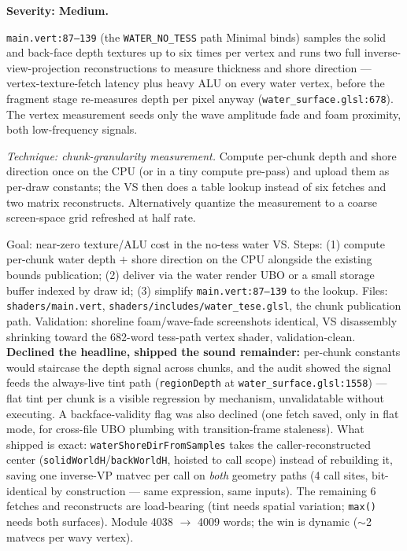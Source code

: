 \documentclass[11pt,a4paper]{article}
\begin{document}
\textbf{Severity: Medium.}

\texttt{main.vert:87--139} (the \texttt{WATER\_NO\_TESS} path Minimal binds)
samples the solid and back-face depth textures up to six times per vertex and
runs two full inverse-view-projection reconstructions to measure thickness and
shore direction --- vertex-texture-fetch latency plus heavy ALU on every water
vertex, before the fragment stage re-measures depth per pixel anyway
(\texttt{water\_surface.glsl:678}). The vertex measurement seeds only the wave
amplitude fade and foam proximity, both low-frequency signals.

\textit{Technique: chunk-granularity measurement.} Compute per-chunk depth and
shore direction once on the CPU (or in a tiny compute pre-pass) and upload
them as per-draw constants; the VS then does a table lookup instead of six
fetches and two matrix reconstructs. Alternatively quantize the measurement to
a coarse screen-space grid refreshed at half rate.

\begin{tcolorbox}[promptbox={Prompt --- M12: hoist water-vertex depth measurement out of the VS}]
Goal: near-zero texture/ALU cost in the no-tess water VS. Steps: (1) compute
per-chunk water depth $+$ shore direction on the CPU alongside the existing
bounds publication; (2) deliver via the water render UBO or a small storage
buffer indexed by draw id; (3) simplify \texttt{main.vert:87--139} to the
lookup. Files: \texttt{shaders/main.vert},
\texttt{shaders/includes/water\_tese.glsl}, the chunk publication path.
Validation: shoreline foam/wave-fade screenshots identical, VS disassembly
shrinking toward the 682-word tess-path vertex shader, validation-clean.
\\ \textbf{Declined the headline, shipped the sound remainder:} per-chunk
constants would staircase the depth signal across chunks, and the audit
showed the signal feeds the always-live tint path
(\texttt{regionDepth} at \texttt{water\_surface.glsl:1558}) --- flat tint per
chunk is a visible regression by mechanism, unvalidatable without executing.
A backface-validity flag was also declined (one fetch saved, only in flat
mode, for cross-file UBO plumbing with transition-frame staleness). What
shipped is exact: \texttt{waterShoreDirFromSamples} takes the
caller-reconstructed center (\texttt{solidWorldH}/\texttt{backWorldH},
hoisted to call scope) instead of rebuilding it, saving one inverse-VP
matvec per call on \emph{both} geometry paths (4 call sites, bit-identical
by construction --- same expression, same inputs). The remaining 6 fetches
and reconstructs are load-bearing (tint needs spatial variation;
\texttt{max()} needs both surfaces). Module 4038 $\rightarrow$ 4009 words;
the win is dynamic ($\sim$2 matvecs per wavy vertex).
\end{tcolorbox}
\end{document}
